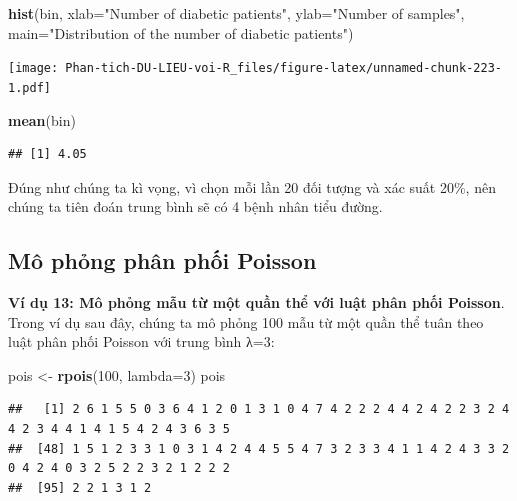 \documentclass[
]{book}
\newenvironment{Shaded}{\begin{snugshade}}{\end{snugshade}}
\newcommand{\DataTypeTok}[1]{\textcolor[rgb]{0.13,0.29,0.53}{#1}}
\newcommand{\DecValTok}[1]{\textcolor[rgb]{0.00,0.00,0.81}{#1}}
\newcommand{\KeywordTok}[1]{\textcolor[rgb]{0.13,0.29,0.53}{\textbf{#1}}}
\newcommand{\NormalTok}[1]{#1}
\newcommand{\StringTok}[1]{\textcolor[rgb]{0.31,0.60,0.02}{#1}}
\begin{document}
\begin{Shaded}
\begin{Highlighting}[]
\KeywordTok{hist}\NormalTok{(bin,}
       \DataTypeTok{xlab=}\StringTok{"Number of diabetic patients"}\NormalTok{,}
       \DataTypeTok{ylab=}\StringTok{"Number of samples"}\NormalTok{,}
       \DataTypeTok{main=}\StringTok{"Distribution of the number of diabetic patients"}\NormalTok{)}
\end{Highlighting}
\end{Shaded}

\texttt{[image: Phan-tich-DU-LIEU-voi-R\_files/figure-latex/unnamed-chunk-223-1.pdf]}

\begin{Shaded}
\begin{Highlighting}[]
\KeywordTok{mean}\NormalTok{(bin)}
\end{Highlighting}
\end{Shaded}

\begin{verbatim}
## [1] 4.05
\end{verbatim}

Đúng như chúng ta kì vọng, vì chọn mỗi lần 20 đối tượng và xác suất 20\%, nên chúng ta tiên đoán trung bình sẽ có 4 bệnh nhân tiểu đường.

\hypertarget{muxf4-phux1ecfng-phuxe2n-phux1ed1i-poisson}{%
\subsection{Mô phỏng phân phối Poisson}\label{muxf4-phux1ecfng-phuxe2n-phux1ed1i-poisson}}

\textbf{Ví dụ 13: Mô phỏng mẫu từ một quần thể với luật phân phối Poisson}. Trong ví dụ sau đây, chúng ta mô phỏng 100 mẫu từ một quần thể tuân theo luật phân phối Poisson với trung bình λ=3:

\begin{Shaded}
\begin{Highlighting}[]
\NormalTok{pois \textless{}{-}}\StringTok{ }\KeywordTok{rpois}\NormalTok{(}\DecValTok{100}\NormalTok{, }\DataTypeTok{lambda=}\DecValTok{3}\NormalTok{)}
\NormalTok{pois}
\end{Highlighting}
\end{Shaded}

\begin{verbatim}
##   [1] 2 6 1 5 5 0 3 6 4 1 2 0 1 3 1 0 4 7 4 2 2 2 4 4 2 4 2 2 3 2 4 4 2 3 4 4 1 4 1 5 4 2 4 3 6 3 5
##  [48] 1 5 1 2 3 3 1 0 3 1 4 2 4 4 5 5 4 7 3 2 3 3 4 1 1 4 2 4 3 3 2 0 4 2 4 0 3 2 5 2 2 3 2 1 2 2 2
##  [95] 2 2 1 3 1 2
\end{verbatim}
\end{document}

